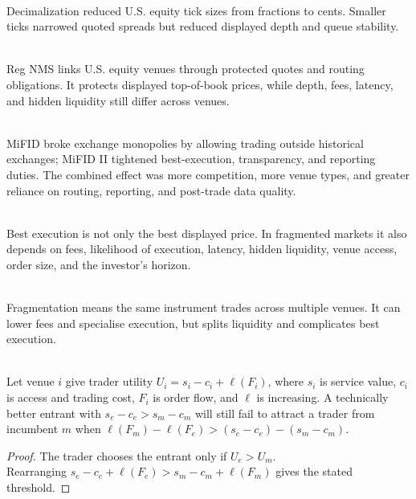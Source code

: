 \begin{marketrule} \\
Decimalization reduced U.S. equity tick sizes from fractions to cents. Smaller ticks narrowed quoted spreads but reduced displayed depth and queue stability.
\end{marketrule}

\begin{marketrule} \\
Reg NMS links U.S. equity venues through protected quotes and routing obligations. It protects displayed top-of-book prices, while depth, fees, latency, and hidden liquidity still differ across venues.
\end{marketrule}

\begin{marketrule} \\
MiFID broke exchange monopolies by allowing trading outside historical exchanges; MiFID II tightened best-execution, transparency, and reporting duties. The combined effect was more competition, more venue types, and greater reliance on routing, reporting, and post-trade data quality.
\end{marketrule}

\begin{principle} \\
Best execution is not only the best displayed price. In fragmented markets it also depends on fees, likelihood of execution, latency, hidden liquidity, venue access, order size, and the investor's horizon.
\end{principle}

\begin{mechanism} \\
Fragmentation means the same instrument trades across multiple venues. It can lower fees and specialise execution, but splits liquidity and complicates best execution.
\end{mechanism}

\begin{proposition} \\
Let venue $i$ give trader utility $U_i=s_i-c_i+\ell(F_i)$, where $s_i$ is service value, $c_i$ is access and trading cost, $F_i$ is order flow, and $\ell$ is increasing. A technically better entrant with $s_e-c_e>s_m-c_m$ will still fail to attract a trader from incumbent $m$ when $\ell(F_m)-\ell(F_e)> (s_e-c_e)-(s_m-c_m)$.
\begin{proof}
The trader chooses the entrant only if $U_e>U_m$.\\
Rearranging $s_e-c_e+\ell(F_e)>s_m-c_m+\ell(F_m)$ gives the stated threshold.
\end{proof}
\end{proposition}

